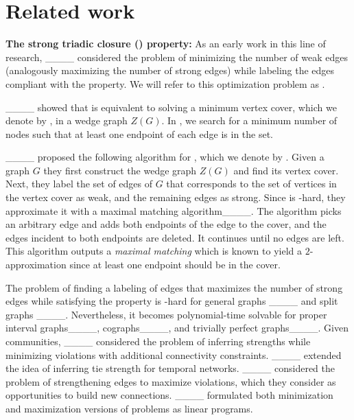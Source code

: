 \section{Related work}
\label{sec:related}

\textbf{The strong triadic closure (\stc) property:}
As an early work in this line of research, ____ considered the problem of minimizing the number of weak edges (analogously maximizing the number of strong edges) while labeling the edges compliant with the \stc property.
We will refer to this optimization problem as \prbminSTC.

____ showed
that \prbminSTC is equivalent to solving a minimum vertex cover, which we denote by \prbcovermin, in a wedge graph $Z(G)$.
In \prbcovermin, we search for a minimum number of nodes such that at least one endpoint of each edge is in the set.

____ proposed the following algorithm for \prbminSTC, which we denote by \algminstc.
Given a graph $G$ they first construct the wedge graph $Z(G)$ and find its vertex cover. Next, they label the set of edges of $G$ that corresponds to the set of vertices in the vertex cover as weak, and the remaining edges as strong. Since \prbcovermin is \np-hard, they approximate it with a maximal matching algorithm____. The algorithm picks an arbitrary edge and adds both endpoints of the edge to the cover, and the edges incident to both endpoints are deleted. It continues until no edges are left. This algorithm outputs a {\em maximal matching} which is known to yield a $2$-approximation since at least one endpoint should be in the cover.

The problem of finding a labeling of edges that maximizes the number of strong edges while satisfying the \stc property is \np-hard for general graphs ____ and split graphs ____. 
Nevertheless, it becomes polynomial-time solvable for proper interval
graphs____, cographs____, and trivially perfect graphs____.
Given communities, ____ considered the problem of inferring strengths while minimizing \stc violations with additional connectivity constraints.
____ extended the idea of inferring tie strength for temporal networks.
____ considered the problem of strengthening edges to maximize \stc violations, which they consider as opportunities to build new connections.
____ formulated both minimization and maximization versions of \stc problems as linear programs.

